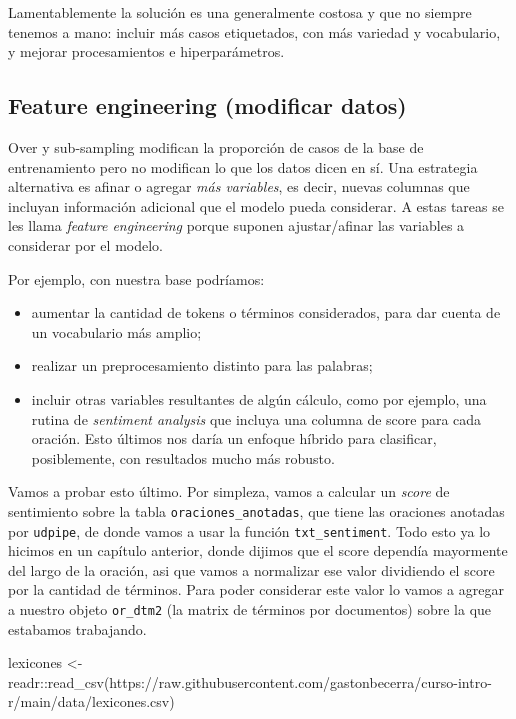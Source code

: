 \documentclass[
]{book}
\newenvironment{Shaded}{\begin{snugshade}}{\end{snugshade}}
\newcommand{\FunctionTok}[1]{\textcolor[rgb]{0.00,0.00,0.00}{#1}}
\newcommand{\NormalTok}[1]{#1}
\newcommand{\OtherTok}[1]{\textcolor[rgb]{0.56,0.35,0.01}{#1}}
\newcommand{\SpecialCharTok}[1]{\textcolor[rgb]{0.00,0.00,0.00}{#1}}
\newcommand{\StringTok}[1]{\textcolor[rgb]{0.31,0.60,0.02}{#1}}
\providecommand{\tightlist}{%
  \setlength{\itemsep}{0pt}\setlength{\parskip}{0pt}}
\begin{document}
Lamentablemente la solución es una generalmente costosa y que no siempre tenemos a mano: incluir más casos etiquetados, con más variedad y vocabulario, y mejorar procesamientos e hiperparámetros.

\hypertarget{feature-engineering-modificar-datos}{%
\subsection{Feature engineering (modificar datos)}\label{feature-engineering-modificar-datos}}

Over y sub-sampling modifican la proporción de casos de la base de entrenamiento pero no modifican lo que los datos dicen en sí. Una estrategia alternativa es afinar o agregar \emph{más variables}, es decir, nuevas columnas que incluyan información adicional que el modelo pueda considerar. A estas tareas se les llama \emph{feature engineering} porque suponen ajustar/afinar las variables a considerar por el modelo.

Por ejemplo, con nuestra base podríamos:

\begin{itemize}
\tightlist
\item
  aumentar la cantidad de tokens o términos considerados, para dar cuenta de un vocabulario más amplio;
\item
  realizar un preprocesamiento distinto para las palabras;
\item
  incluir otras variables resultantes de algún cálculo, como por ejemplo, una rutina de \emph{sentiment analysis} que incluya una columna de score para cada oración. Esto últimos nos daría un enfoque híbrido para clasificar, posiblemente, con resultados mucho más robusto.
\end{itemize}

Vamos a probar esto último. Por simpleza, vamos a calcular un \emph{score} de sentimiento sobre la tabla \texttt{oraciones\_anotadas}, que tiene las oraciones anotadas por \texttt{udpipe}, de donde vamos a usar la función \texttt{txt\_sentiment}. Todo esto ya lo hicimos en un capítulo anterior, donde dijimos que el score dependía mayormente del largo de la oración, asi que vamos a normalizar ese valor dividiendo el score por la cantidad de términos.
Para poder considerar este valor lo vamos a agregar a nuestro objeto \texttt{or\_dtm2} (la matrix de términos por documentos) sobre la que estabamos trabajando.

\begin{Shaded}
\begin{Highlighting}[]
\NormalTok{lexicones }\OtherTok{\textless{}{-}}\NormalTok{ readr}\SpecialCharTok{::}\FunctionTok{read\_csv}\NormalTok{(}\StringTok{\textquotesingle{}https://raw.githubusercontent.com/gastonbecerra/curso{-}intro{-}r/main/data/lexicones.csv\textquotesingle{}}\NormalTok{)}
\end{Highlighting}
\end{Shaded}
\end{document}
